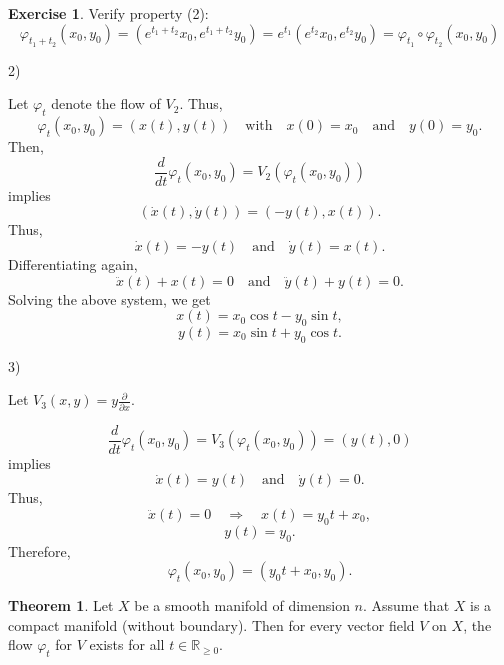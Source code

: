 \documentclass[11pt]{article}
\theoremstyle{definition}
\newtheorem{theorem}{Theorem}[section]
\newtheorem{exercise}{Exercise}
\theoremstyle{remark}
\begin{document}
\begin{exercise}
Verify property (2):
\[
\varphi_{t_1 + t_2}(x_0, y_0) = \left(e^{t_1 + t_2} x_0, e^{t_1 + t_2} y_0 \right) = e^{t_1} \left(e^{t_2} x_0, e^{t_2} y_0 \right) = \varphi_{t_1} \circ \varphi_{t_2}(x_0, y_0)
\]
\end{exercise}

2)

Let $\varphi_t$ denote the flow of $V_2$. Thus,
\[
\varphi_t(x_0, y_0) = (x(t), y(t)) \quad \text{with} \quad x(0) = x_0 \quad \text{and} \quad y(0) = y_0.
\]
Then,
\[
\frac{d}{dt} \varphi_t(x_0, y_0) = V_2(\varphi_t(x_0, y_0))
\]
implies
\[
(\dot{x}(t), \dot{y}(t)) = (-y(t), x(t)).
\]
Thus,
\[
\dot{x}(t) = -y(t) \quad \text{and} \quad \dot{y}(t) = x(t).
\]
Differentiating again,
\[
\ddot{x}(t) + x(t) = 0 \quad \text{and} \quad \ddot{y}(t) + y(t) = 0.
\]
Solving the above system, we get
\[
x(t) = x_0 \cos t - y_0 \sin t,
\]
\[
y(t) = x_0 \sin t + y_0 \cos t.
\]

\begin{center}
\end{center}

3)

Let $V_3(x, y) = y \frac{\partial}{\partial x}$.

\[
\frac{d}{dt} \varphi_t(x_0, y_0) = V_3(\varphi_t(x_0, y_0)) = (y(t), 0)
\]
implies
\[
\dot{x}(t) = y(t) \quad \text{and} \quad \dot{y}(t) = 0.
\]
Thus,
\[
\ddot{x}(t) = 0 \quad \Rightarrow \quad x(t) = y_0 t + x_0,
\]
\[
y(t) = y_0.
\]
Therefore,
\[
\varphi_t(x_0, y_0) = (y_0 t + x_0, y_0).
\]

\begin{theorem}\label{thm:flow_existence_compact}
Let $X$ be a smooth manifold of dimension $n$. Assume that $X$ is a compact manifold (without boundary). Then for every vector field $V$ on $X$, the flow $\varphi_t$ for $V$ exists for all $t \in \mathbb{R}_{\geq 0}$.
\end{theorem}
\end{document}
